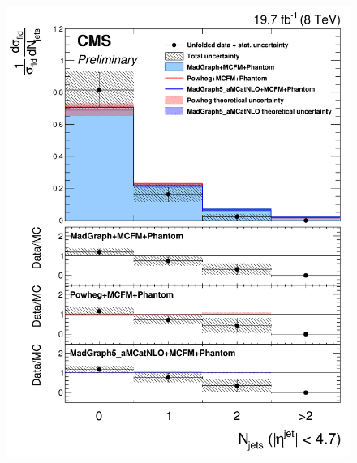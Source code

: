 \begin{figure}[hbtp]
\begin{center}
    \includegraphics[width=\cmsFigWidth]{Figures/DiffCrossSecZZTo2e2mJets_Unfolded_fr_MadGraph_norm.png}       

\end{center}
\end{figure}
